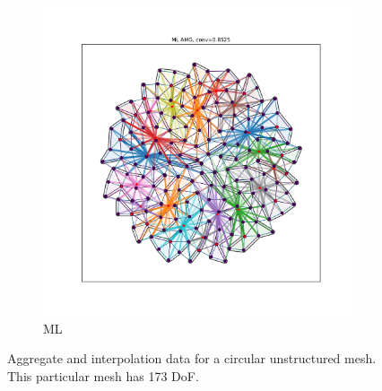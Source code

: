 \documentclass{article}
\begin{document}
\begin{figure}[h]
\begin{subfigure}[t]{0.49\textwidth}
    \includegraphics[width=\textwidth, trim=80 70 70 50, clip]{grid_circle_ml.pdf}
    \caption{ML}
  \end{subfigure}
  \caption{Aggregate and interpolation data for a circular unstructured mesh.  This particular mesh has 173 DoF.}
  \label{fig:gridcircle}
\end{figure}
\end{document}
